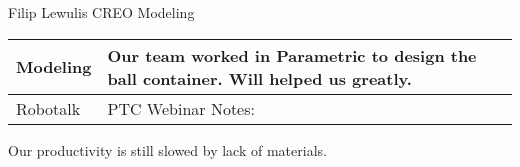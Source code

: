 Filip Lewulis
CREO Modeling 
\begin{tabular}{|p{5cm}|p{5cm}|}
  \hline
  Modeling&
  Our team worked in Parametric to design the ball container. Will helped us greatly.\\
  \hline
  Robotalk&
  PTC Webinar Notes:
  
  
  
  \\
  \hline
\end{tabular}
Our productivity is still slowed by lack of materials.
  
